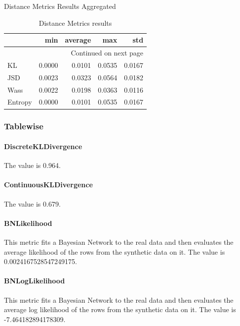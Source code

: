 \documentclass{article}
\begin{document}
\caption{Distance Metrics Results Aggregated}\label{tab:distance}   
\begin{longtable}{lrrrr}
\caption{Distance Metrics results}\label{tab:distance}\\
\toprule
{} &    min &  average &    max &    std \\
\midrule
\endhead
\midrule
\multicolumn{5}{r}{{Continued on next page}} \\
\midrule
\endfoot

\bottomrule
\endlastfoot
KL      & 0.0000 &   0.0101 & 0.0535 & 0.0167 \\
JSD     & 0.0023 &   0.0323 & 0.0564 & 0.0182 \\
Wass    & 0.0022 &   0.0198 & 0.0363 & 0.0116 \\
Entropy & 0.0000 &   0.0101 & 0.0535 & 0.0167 \\
\end{longtable}

    

\subsubsection{Tablewise}

\paragraph{DiscreteKLDivergence}

The value is 0.964.\\

\paragraph{ContinuousKLDivergence}
The value is 0.679.\\


\paragraph{BNLikelihood}

This metric fits a Bayesian Network to the real data and then evaluates the average likelihood of the rows from the synthetic data on it. 
The value is 0.0024167528547249175.\\

\paragraph{BNLogLikelihood}

This metric fits a Bayesian Network to the real data and then evaluates the average log likelihood of the rows from the synthetic data on it.
The value is -7.464182894178309.\\
\end{document}
